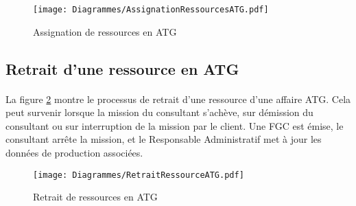 \begin{figure}[H]
	\centering
\begin{sideways}
	\texttt{[image: Diagrammes/AssignationRessourcesATG.pdf]}
\end{sideways}
	\caption{Assignation de ressources en ATG} 
	\label{asgnRcesATG}
\end{figure}


\subsection{Retrait d'une ressource en ATG}
\paragraph{} La figure \ref{retraitATG} montre le processus de retrait d'une ressource d'une affaire ATG. Cela peut survenir lorsque la mission du consultant s'achève, sur démission du consultant ou sur interruption de la mission par le client. Une FGC est émise, le consultant arrête la mission, et le Responsable Administratif met à jour les données de production associées. 


\begin{figure}[H]
	\centering
	\texttt{[image: Diagrammes/RetraitRessourceATG.pdf]}
	\caption{Retrait de ressources en ATG} 
	\label{retraitATG}
\end{figure}

